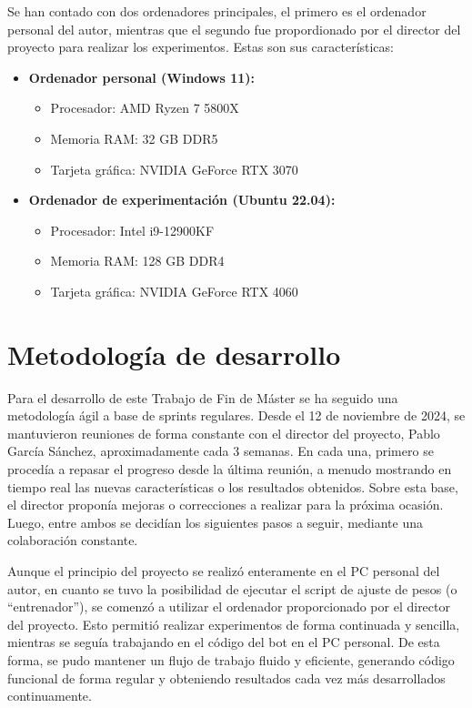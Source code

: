 Se han contado con dos ordenadores principales, el primero es el ordenador personal del autor, mientras que el segundo fue propordionado por el director del proyecto para realizar los experimentos. Estas son sus características:

\begin{itemize}
	\item \textbf{Ordenador personal (Windows 11):}
	      \begin{itemize}
		      \item Procesador: AMD Ryzen 7 5800X
		      \item Memoria RAM: 32 GB DDR5
		      \item Tarjeta gráfica: NVIDIA GeForce RTX 3070
	      \end{itemize}
	\item \textbf{Ordenador de experimentación (Ubuntu 22.04):}
	      \begin{itemize}
		      \item Procesador: Intel i9-12900KF
		      \item Memoria RAM: 128 GB DDR4
		      \item Tarjeta gráfica: NVIDIA GeForce RTX 4060
	      \end{itemize}
\end{itemize}

\section{Metodología de desarrollo} \label{sec:metodologia_desarrollo}


Para el desarrollo de este Trabajo de Fin de Máster se ha seguido una metodología ágil a base de sprints regulares. Desde el 12 de noviembre de 2024, se mantuvieron reuniones de forma constante con el director del proyecto, Pablo García Sánchez, aproximadamente cada 3 semanas. En cada una, primero se procedía a repasar el progreso desde la última reunión, a menudo mostrando en tiempo real las nuevas características o los resultados obtenidos. Sobre esta base, el director proponía mejoras o correcciones a realizar para la próxima ocasión. Luego, entre ambos se decidían los siguientes pasos a seguir, mediante una colaboración constante.

Aunque el principio del proyecto se realizó enteramente en el PC personal del autor, en cuanto se tuvo la posibilidad de ejecutar el script de ajuste de pesos (o ``entrenador''), se comenzó a utilizar el ordenador proporcionado por el director del proyecto. Esto permitió realizar experimentos de forma continuada y sencilla, mientras se seguía trabajando en el código del bot en el PC personal. De esta forma, se pudo mantener un flujo de trabajo fluido y eficiente, generando código funcional de forma regular y obteniendo resultados cada vez más desarrollados continuamente.


